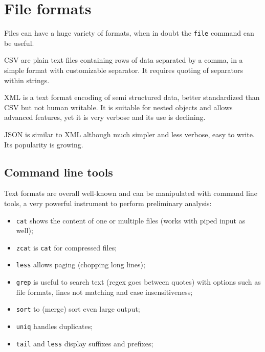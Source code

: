 \section{File formats}
Files can have a huge variety of formats, when in doubt the \texttt{file} command can be useful.

CSV are plain text files containing rows of data separated by a comma, in a simple format with customizable separator. It requires quoting of separators within strings.

XML is a text format encoding of semi structured data, better standardized than CSV but not human writable. It is suitable for nested objects and allows advanced features, yet it is very verbose and its use is declining.

JSON is similar to XML although much simpler and less verbose, easy to write. Its popularity is growing. 

\subsection{Command line tools}
Text formats are overall well-known and can be manipulated with command line tools, a very powerful instrument to perform preliminary analysis:
\begin{itemize}
	\item \texttt{cat} shows the content of one or multiple files (works with piped input as well);
	\item \texttt{zcat} is \texttt{cat} for compressed files;
	\item \texttt{less} allows paging (chopping long lines);
	\item \texttt{grep} is useful to search text (regex goes between quotes) with options such as file formats, lines not matching and case insensitiveness;
	\item \texttt{sort} to (merge) sort even large output;
	\item \texttt{uniq} handles duplicates;
	\item \texttt{tail} and \texttt{less} display suffixes and prefixes;
\end{itemize}
